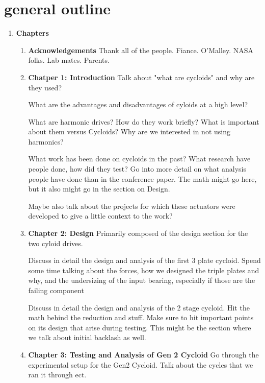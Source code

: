 \section{general outline}
\begin{enumerate}
\item \textbf{Chapters}
  \begin{enumerate}
  		\item \textbf{Acknowledgements}
  		Thank all of the people. 
  		Fiance.
  		O'Malley.
  		NASA folks. 
  		Lab mates. 
  		Parents. 

	  \item \textbf{Chatper 1: Introduction}
	    Talk about "what are cycloids" and why are they used? 

	    What are the advantages and disadvantages of cyloids at a high level?

	    What are harmonic drives? How do they work briefly? What is important about them versus Cycloids? Why are we interested in not using harmonics? 

	    What work has been done on cycloids in the past? What research have people done, how did they test? 
	    Go into more detail on what analysis people have done than in the conference paper. 
	    The math might go here, but it also might go in the section on Design. 

	    Maybe also talk about the projects for which these actuators were developed to give a little context to the work? 

		\item \textbf{Chapter 2: Design}
		Primarily composed of the design section for the two cyloid drives. 

		Discuss in detail the design and analysis of the first 3 plate cycloid. 
		Spend some time talking about the forces, how we designed the triple plates and why, and the undersizing of the input bearing, especially if those are the failing component 

		Discuss in detail the design and analysis of the 2 stage cycloid.
		Hit the math behind the reduction and stuff. 
		Make sure to hit important points on its design that arise during testing.
		This might be the section where we talk about initial backlash as well. 

		\item \textbf{Chapter 3: Testing and Analysis of Gen 2 Cycloid}
		Go through the experimental setup for the Gen2 Cycloid. 
		Talk about the cycles that we ran it through ect. 


\end{enumerate}
\end{enumerate}
